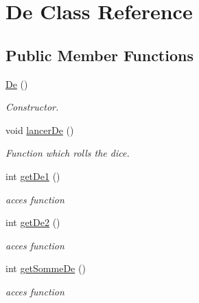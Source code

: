 \hypertarget{class_de}{
\section{De Class Reference}
\label{class_de}
}
\subsection*{Public Member Functions}
\begin{DoxyCompactItemize}
\item 
\hypertarget{class_de_ae6ca2b7255a0bf6dabf745f1f7ca7b40}{
\hyperlink{class_de_ae6ca2b7255a0bf6dabf745f1f7ca7b40}{De} ()}
\label{class_de_ae6ca2b7255a0bf6dabf745f1f7ca7b40}

\begin{DoxyCompactList}\small\item\em Constructor. \item\end{DoxyCompactList}\item 
\hypertarget{class_de_a9e521596288f58f3f626a2d647cb61ac}{
void \hyperlink{class_de_a9e521596288f58f3f626a2d647cb61ac}{lancerDe} ()}
\label{class_de_a9e521596288f58f3f626a2d647cb61ac}

\begin{DoxyCompactList}\small\item\em Function which rolls the dice. \item\end{DoxyCompactList}\item 
\hypertarget{class_de_a334a890391deb61b78eaac1d0d4a8bf3}{
int \hyperlink{class_de_a334a890391deb61b78eaac1d0d4a8bf3}{getDe1} ()}
\label{class_de_a334a890391deb61b78eaac1d0d4a8bf3}

\begin{DoxyCompactList}\small\item\em acces function \item\end{DoxyCompactList}\item 
\hypertarget{class_de_a014241cfbda49a45e77bb98ec7fdf185}{
int \hyperlink{class_de_a014241cfbda49a45e77bb98ec7fdf185}{getDe2} ()}
\label{class_de_a014241cfbda49a45e77bb98ec7fdf185}

\begin{DoxyCompactList}\small\item\em acces function \item\end{DoxyCompactList}\item 
\hypertarget{class_de_a762d3727703344da5a066639b0da015d}{
int \hyperlink{class_de_a762d3727703344da5a066639b0da015d}{getSommeDe} ()}
\label{class_de_a762d3727703344da5a066639b0da015d}

\begin{DoxyCompactList}\small\item\em acces function \item\end{DoxyCompactList}\end{DoxyCompactItemize}



